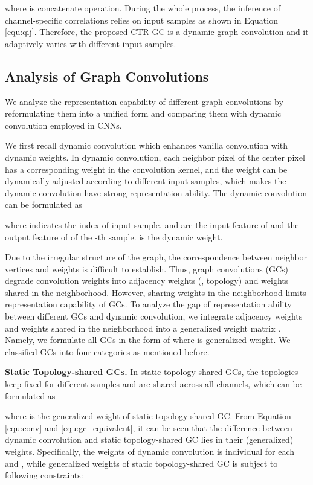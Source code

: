 \documentclass[10pt,twocolumn,letterpaper]{article}
\begin{document}
where  is concatenate operation. During the whole process, the inference of channel-specific correlations  relies on input samples as shown in Equation \ref{equ:qij}. Therefore, the proposed CTR-GC is a dynamic graph convolution and it adaptively varies with different input samples.

\subsection{Analysis of Graph Convolutions}
We analyze the representation capability of different graph convolutions by reformulating them into a unified form and comparing them with dynamic convolution \cite{chen2020dynamic,yang2019condconv} employed in CNNs.

We first recall dynamic convolution which enhances vanilla convolution with dynamic weights. In dynamic convolution, each neighbor pixel  of the center pixel  has a corresponding weight in the convolution kernel, and the weight can be dynamically adjusted according to different input samples, which makes the dynamic convolution have strong representation ability. The dynamic convolution can be formulated as
\vspace{-0.15cm}

where  indicates the index of input sample.  and  are the input feature of  and the output feature of  of the -th sample.  is the dynamic weight. 



Due to the irregular structure of the graph, the correspondence between neighbor vertices and weights is difficult to establish. Thus, graph convolutions (GCs) degrade convolution weights into adjacency weights (\ie, topology) and weights shared in the neighborhood. However, sharing weights in the neighborhood limits representation capability of GCs. To analyze the gap of representation ability between different GCs and dynamic convolution, we integrate adjacency weights and weights shared in the neighborhood into a generalized weight matrix . Namely, we formulate all GCs in the form of  where  is generalized weight. We classified GCs into four categories as mentioned before.

\noindent \textbf{Static Topology-shared GCs.} In static topology-shared GCs, the topologies keep fixed for different samples and are shared across all channels, which can be formulated as 

where   is the generalized weight of static topology-shared GC. From Equation \ref{equ:conv} and \ref{equ:gc_equivalent}, it can be seen that the difference between dynamic convolution and static topology-shared GC lies in their (generalized) weights. Specifically, the weights of dynamic convolution  is individual for each  and , while generalized weights of static topology-shared GC is subject to following constraints:
\end{document}
